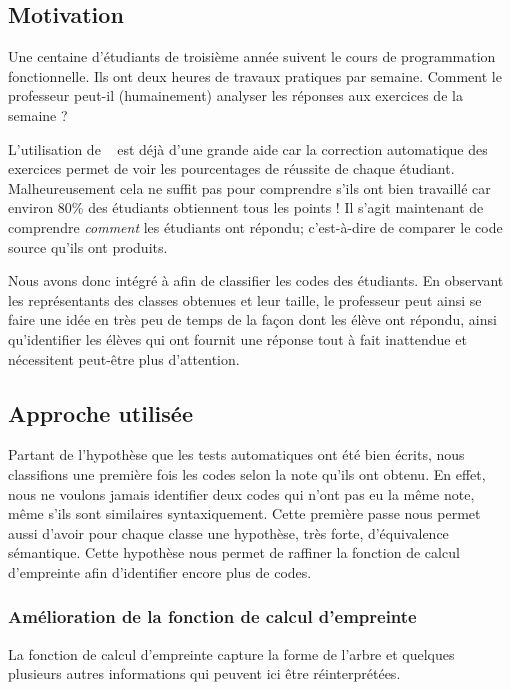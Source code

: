 
\subsection{Motivation}
Une centaine d'étudiants de troisième année suivent le cours de
programmation fonctionnelle. Ils ont deux heures de travaux pratiques
par semaine. Comment le professeur peut-il (humainement) analyser les
réponses aux exercices de la semaine ?

L'utilisation de {\LearnOCaml}~\cite{learnocaml} est déjà d'une grande
aide car la correction automatique des exercices permet de voir les
pourcentages de réussite de chaque étudiant. Malheureusement cela ne
suffit pas pour comprendre s'ils ont bien travaillé car environ 80\%
des étudiants obtiennent tous les points ! Il s'agit maintenant de
comprendre \emph{comment} les étudiants ont répondu; c'est-à-dire de
comparer le code source qu'ils ont produits.

Nous avons donc intégré {\Asak} à {\LearnOCaml} afin de classifier les
codes des étudiants. En observant les représentants des classes
obtenues et leur taille, le professeur peut ainsi se faire une idée en
très peu de temps de la façon dont les élève ont répondu, ainsi
qu'identifier les élèves qui ont fournit une réponse tout à fait
inattendue et nécessitent peut-être plus d'attention.

\subsection{Approche utilisée}
Partant de l'hypothèse que les tests automatiques ont été bien écrits,
nous classifions une première fois les codes selon la note qu'ils ont
obtenu. En effet, nous ne voulons jamais identifier deux codes qui
n'ont pas eu la même note, même s'ils sont similaires
syntaxiquement. Cette première passe nous permet aussi d'avoir pour
chaque classe une hypothèse, très forte, d'équivalence sémantique.
Cette hypothèse nous permet de raffiner la fonction de calcul
d'empreinte afin d'identifier encore plus de codes.

\subsubsection{Amélioration de la fonction de calcul d'empreinte}
La fonction de calcul d'empreinte capture la forme de l'arbre et
quelques plusieurs autres informations qui peuvent ici être
réinterprétées.

